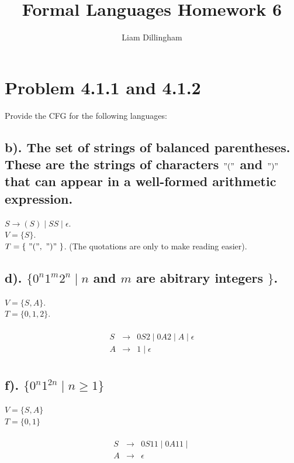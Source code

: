 \documentclass[20pt]{article} %
\title{Formal Languages Homework 6}
\author{Liam Dillingham}
\begin{document}
\maketitle

\section{Problem 4.1.1 and 4.1.2}
Provide the CFG for the following languages: 
\subsection{b). The set of strings of balanced parentheses. These are the strings of characters $"("$ and $")"$ that can appear in a well-formed arithmetic expression.}
$S \rightarrow (S) \mid SS \mid \epsilon$.\\
$ V = \{ S \}$. \\ 
$T = \{ \ "(", \ ")" \ \}$. (The quotations are only to make reading easier).

\subsection{d). $\{0^{n}1^{m}2^{n} \mid n$ and $m$ are abitrary integers $\}$.}
$V = \{ S, A \}$. \\
$T = \{0,1,2\}$.\\
 \begin{table}[!htbp]
 \[\begin{array}{ccc} 
&  \\
 S & \rightarrow & 0S2 \mid 0A2 \mid A \mid \epsilon\\
 A & \rightarrow & 1 \mid \epsilon \\
 \end{array}\]
 \end{table}
\subsection{f). $\{0^{n}1^{2n} \mid n \geq 1\}$}
$V = \{S, A\}$ \\
$T = \{0, 1\}$\\
 \begin{table}[!htbp]
 \[\begin{array}{ccc} 
&  \\
 S & \rightarrow & 0S11 \mid 0A11 \mid \\
 A & \rightarrow & \epsilon \\
 \end{array}\]
 \end{table}
\end{document}
